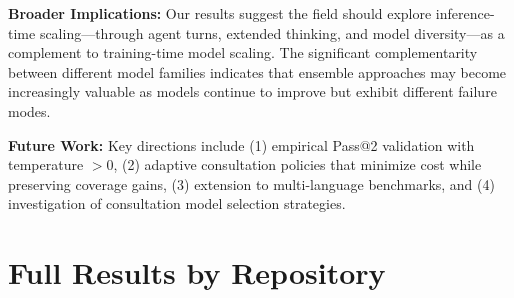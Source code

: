 \documentclass[11pt,a4paper]{article}
\begin{document}
\textbf{Broader Implications:} Our results suggest the field should explore inference-time scaling---through agent turns, extended thinking, and model diversity---as a complement to training-time model scaling. The significant complementarity between different model families indicates that ensemble approaches may become increasingly valuable as models continue to improve but exhibit different failure modes.

\textbf{Future Work:} Key directions include (1) empirical Pass@2 validation with temperature $> 0$, (2) adaptive consultation policies that minimize cost while preserving coverage gains, (3) extension to multi-language benchmarks, and (4) investigation of consultation model selection strategies.

\appendix

\section{Full Results by Repository}

\begin{table}[h]
\centering
\caption{Complete Results by Repository}
\end{table}
\end{document}
